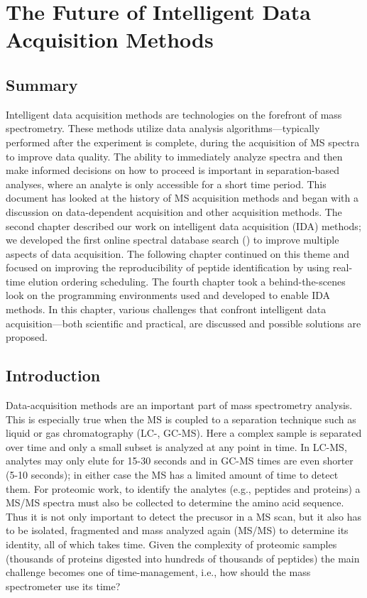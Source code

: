 \chapter{The Future of Intelligent Data Acquisition Methods}

\section{Summary}
Intelligent data acquisition methods are technologies on the forefront of mass spectrometry. These methods utilize data analysis algorithms---typically performed after the experiment is complete, during the acquisition of MS spectra to improve data quality. The ability to immediately analyze spectra and then make informed decisions on how to proceed is important in separation-based analyses, where an analyte is only accessible for a short time period. This document has looked at the history of MS acquisition methods and began with a discussion on data-dependent acquisition and other acquisition methods. The second chapter described our work on intelligent data acquisition (IDA) methods; we developed the first online spectral database search (\inseq{}) to improve multiple aspects of data acquisition. The following chapter continued on this theme and focused on improving the reproducibility of peptide identification by using real-time elution ordering scheduling. The fourth chapter took a behind-the-scenes look on the programming environments used and developed to enable IDA methods. In this chapter, various challenges that confront intelligent data acquisition---both scientific and practical, are discussed and possible solutions are proposed.

\section{Introduction}
Data-acquisition methods are an important part of mass spectrometry analysis. This is especially true when the MS is coupled to a separation technique such as liquid or gas chromatography (LC-, GC-MS). Here a complex sample is separated over time and only a small subset is analyzed at any point in time. In LC-MS, analytes may only elute for 15-30 seconds and in GC-MS times are even shorter (5-10 seconds); in either case the MS has a limited amount of time to detect them. For proteomic work, to identify the analytes (e.g., peptides and proteins) a MS/MS spectra must also be collected to determine the amino acid sequence. Thus it is not only important to detect the precusor in a MS scan, but it also has to be isolated, fragmented and mass analyzed again (MS/MS) to determine its identity, all of which takes time. Given the complexity of proteomic samples (thousands of proteins digested into hundreds of thousands of peptides) the main challenge becomes one of time-management, i.e., how should the mass spectrometer use its time?


